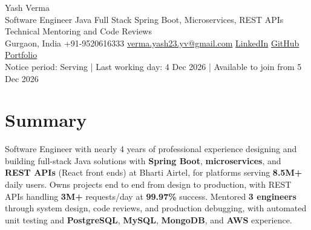 \documentclass[letterpaper,10pt]{article}
\begin{document}
\begin{center}
  {\Huge Yash Verma} \\
  \small Software Engineer \textbar{} Java Full Stack \textbar{} Spring Boot, Microservices, REST APIs \textbar{} Technical Mentoring and Code Reviews \\
  \small Gurgaon, India \textbar{} +91-9520616333 \textbar{} \href{mailto:verma.yash23.yv@gmail.com}{verma.yash23.yv@gmail.com} \textbar{}
  \href{https://www.linkedin.com/in/yash-verma-9243a7193/}{LinkedIn} \textbar{}
  \href{https://github.com/yashverma230600}{GitHub} \textbar{}
  \href{https://yashverma230600.github.io/yash-portfolio/}{Portfolio} \\
  Notice period: Serving | Last working day: 4 Dec 2026 | Available to join from 5 Dec 2026
  \vspace{-8pt}
\end{center}

\section{Summary}
\begin{itemize}[leftmargin=0.15in, label={}]
  \small{\item{
    Software Engineer with nearly 4 years of professional experience designing and building full-stack Java solutions with \textbf{Spring Boot}, \textbf{microservices}, and \textbf{REST APIs} (React front ends) at Bharti Airtel, for platforms serving \textbf{8.5M+} daily users. Owns projects end to end from design to production, with REST APIs handling \textbf{3M+} requests/day at \textbf{99.97\%} success. Mentored \textbf{3 engineers} through system design, code reviews, and production debugging, with automated unit testing and \textbf{PostgreSQL}, \textbf{MySQL}, \textbf{MongoDB}, and \textbf{AWS} experience.
  }}
\end{itemize}
\vspace{-8pt}

\end{document}
